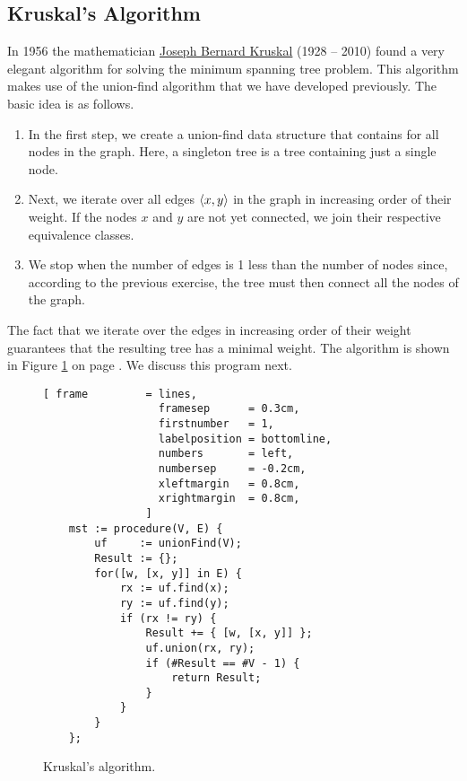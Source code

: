 \subsection{Kruskal's Algorithm}
In 1956 the mathematician \href{https://en.wikipedia.org/wiki/Joseph_Kruskal}{Joseph Bernard Kruskal} (1928 -- 2010) 
found a very elegant algorithm for solving the minimum spanning tree problem.   This algorithm makes use
of the union-find algorithm that we have developed previously.  The basic idea is as
follows.
\begin{enumerate}
\item In the first step, we create a union-find data structure that contains 
      for all nodes in the graph.  Here, a singleton tree is a tree containing just a single node.
\item Next, we iterate over all edges $\pair(x, y)$ in the graph in increasing order of their
      weight.  If the nodes $x$ and $y$ are not yet connected, we join their respective equivalence
      classes. 
\item We stop when the number of edges is 1 less than the number of nodes since, according to the
      previous exercise, the tree must then connect all the nodes of the graph. 
\end{enumerate}
The fact that we iterate over the edges in increasing order of their weight guarantees that the
resulting tree has a minimal weight.
The algorithm is shown in Figure \ref{fig:kruskal.stlx} on page \pageref{fig:kruskal.stlx}.  We
discuss this program next. 

\begin{figure}[!ht]
\centering
\begin{Verbatim}[ frame         = lines, 
                  framesep      = 0.3cm, 
                  firstnumber   = 1,
                  labelposition = bottomline,
                  numbers       = left,
                  numbersep     = -0.2cm,
                  xleftmargin   = 0.8cm,
                  xrightmargin  = 0.8cm,
                ]
    mst := procedure(V, E) {
        uf     := unionFind(V);
        Result := {};
        for([w, [x, y]] in E) {
            rx := uf.find(x);
            ry := uf.find(y);
            if (rx != ry) {
                Result += { [w, [x, y]] };
                uf.union(rx, ry);
                if (#Result == #V - 1) {
                    return Result;
                }
            }
        }        
    };
\end{Verbatim}
\vspace*{-0.3cm}
\caption{Kruskal's algorithm.}
\label{fig:kruskal.stlx}
\end{figure}

